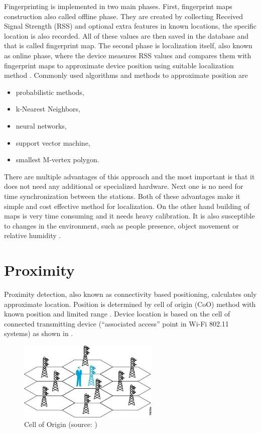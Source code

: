 Fingerprinting is implemented in two main phases. First, fingerprint maps construction also called offline phase. They are created by collecting Received Signal Strength (RSS) and optional extra features in known locations, the specific location is also recorded. All of these values are then saved in the database and that is called fingerprint map. The second phase is localization itself, also known as online phase, where the device measures RSS values and compares them with fingerprint maps to approximate device position using suitable localization method \cite{LocalizationApproaches, ILWTP}. Commonly used algorithms and methods to approximate position are \cite{IILUBLEB}

\begin{itemize}
	\item probabilistic methods,
	\item k-Nearest Neighbors,
	\item neural networks,
	\item support vector machine,
	\item smallest M-vertex polygon.
\end{itemize}

There are multiple advantages of this approach and the most important is that it does not need any additional or specialized hardware. Next one is no need for time synchronization between the stations. Both of these advantages make it simple and cost effective method for localization. On the other hand building of maps is very time consuming and it needs heavy calibration. It is also susceptible to changes in the environment, such as people presence, object movement or relative humidity \cite{IILUBLEB, RSSFofIFD}.

\section{Proximity}\label{sec:Proximity}
Proximity detection, also known as connectivity based positioning, calculates only approximate location. Position is determined by cell of origin (CoO) method with known position and limited range \cite{RAinWILTaS}. Device location is based on the cell of connected transmitting device (\enquote{associated access} point in Wi-Fi 802.11 systems) as shown in  \cite{WiFiLBS}.

\begin{figure}[h!]
	\begin{centering}
		\includegraphics[width=0.6\textwidth]{img/cell_of_origin}
		\par\end{centering}
	\caption{Cell of Origin (source: \cite{WiFiLBS})\label{fig:CellOfOrigin}}
	\label{fig04c02}
\end{figure}

